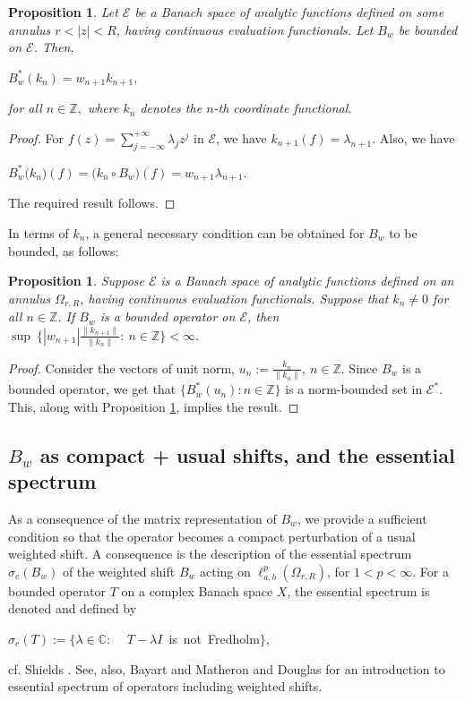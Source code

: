 \documentclass[12pt, reqno]{amsart}
\newtheorem{proposition}[theorem]{Proposition}
\theoremstyle{definition}
\theoremstyle{remark}
\numberwithin{equation}{section}
\begin{document}
\begin{proposition}\label{act-like}
Let $\mathcal{E}$ be a Banach space of analytic functions defined on some annulus $r<|z|<R$, having continuous evaluation functionals. Let $B_{w}$ be bounded on $\mathcal{E}$. Then, 
\begin{center}
$B_{w}^{*}(k_{n}) =w_{n+1}k_{n+1},$
\end{center} for all $n\in \mathbb{Z},$ where $k_n$ denotes the $n$-th coordinate functional.
\end{proposition}
\begin{proof}
  For $f(z)=\sum_{j=-\infty}^{+\infty}\lambda_{j}z^{j}$ in $\mathcal{E}$, we have $k_{n+1}(f)=\lambda_{n+1}.$  Also, we have 
  \begin{center}
  $B_{w}^{*}\big(k_{n}\big)(f)=\big(k_{n}\circ B_{w}\big)(f)=w_{n+1}\lambda_{n+1}.$
   \end{center}
  The required result follows.
\end{proof}
In terms of $k_n$, a general necessary condition can be obtained for $B_w$ to be bounded, as follows:
\begin{proposition}
    Suppose $\mathcal{E}$ is a Banach space of analytic functions defined on an annulus $\Omega_{r,R}$, having continuous evaluation functionals. Suppose that $k_n\neq 0$ for all $n\in \mathbb{Z}$. If $B_w$ is a bounded operator on $\mathcal{E}$, then $\sup ~\Big\{|w_{n+1}|\frac{\|k_{n+1}\|}{\|k_n\|}:~{n\in \mathbb{Z}}\Big\}<\infty.$
\end{proposition}
\begin{proof}
Consider the vectors of unit norm, $u_n:= \frac{k_n}{\|k_n\|}, ~n\in \mathbb{Z}$.
Since $B_w$ is a bounded operator, we get that $\{B_w^*(u_n):n\in \mathbb{Z}\}$ is a norm-bounded set in $\mathcal{E}^*$. This, along with Proposition \ref{act-like}, implies the result.
\end{proof}


 
 
 
\subsection{$B_w$ as compact + usual shifts, and the essential spectrum} As a consequence of the matrix representation of $B_w$, we provide a sufficient condition so that the operator becomes a compact perturbation of a usual weighted shift. A consequence is the description of the essential spectrum $\sigma_e(B_w)$ of the weighted shift $B_w$ acting on $\ell^p_{a,b}(\Omega_{r,R})$, for $1<p<\infty$. For a bounded operator $T$ on a complex Banach space $X$, the essential spectrum is denoted and  defined by 
\begin{center}
$\sigma_e(T):=\{\lambda \in \mathbb{C}:$ ~ $T-\lambda I $~is~not~Fredholm$\}$,
\end{center}
cf.  Shields \cite{Shields}. See, also, Bayart and Matheron \cite{Bayart-Matheron} and Douglas \cite{Douglas} for an introduction to essential spectrum of operators including weighted shifts.
 
\end{document}
